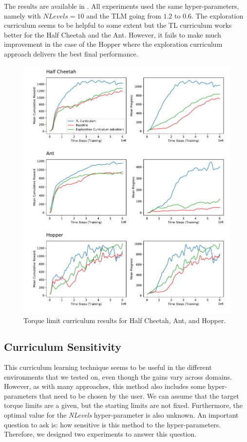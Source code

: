 The results are available in . All experiments used the same hyper-parameters, namely with $NLevels=10$ and the \ac{TLM} going from $1.2$ to $0.6$. The exploration curriculum seems to be helpful to some extent but the \ac{TL} curriculum works better for the Half Cheetah and the Ant. However, it fails to make much improvement in the case of the Hopper where the exploration curriculum approach delivers the best final performance.

\begin{figure}
    \centering
    \includegraphics[width=130mm]{img/TorqueLimit_Envs.pdf}
    \caption{Torque limit curriculum results for Half Cheetah, Ant, and Hopper.}
    \label{fig:torque_limit_envs}
\end{figure}

\subsection{Curriculum Sensitivity}
\label{subsec:curr_sensitivity}

This curriculum learning technique seems to be useful in the different environments that we tested on, even though the gains vary across domains. However, as with many approaches, this method also includes some hyper-parameters that need to be chosen by the user. We can assume that the target torque limits are a given, but the starting limits are not fixed. Furthermore, the optimal value for the \textit{NLevels} hyper-parameter is also unknown. An important question to ask is: how sensitive is this method to the hyper-parameters. Therefore, we designed two experiments to answer this question.

